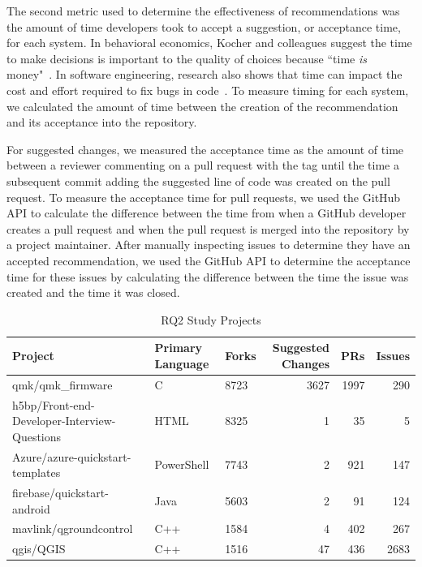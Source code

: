 The second metric used to determine the effectiveness of recommendations was the amount of time developers took to accept a suggestion, or acceptance time, for each system. In behavioral economics, Kocher and colleagues suggest the time to make decisions is important to the quality of choices because ``time \textit{is} money"~\cite{kocher2006time}. In software engineering, research also shows that time can impact the cost and effort required to fix bugs in code~\cite{Williams2007FaultFixTime}. To measure timing for each system, we calculated the amount of time between the creation of the recommendation and its acceptance into the repository.

For suggested changes, we measured the acceptance time as the amount of time between a reviewer commenting on a pull request with the \sugg tag until the time a subsequent commit adding the suggested line of code was created on the pull request. To measure the acceptance time for pull requests, we used the GitHub API to calculate the difference between the time from when a GitHub developer creates a pull request and when the pull request is merged into the repository by a project maintainer. After manually inspecting issues to determine they have an accepted recommendation, we used the GitHub API to determine the acceptance time for these issues by calculating the difference between the time the issue was created and the time it was closed.

\begin{table}[tbh]
\centering
\begin{tabular}{ lllrrr } \hline
  \textbf{Project} & \textbf{Primary Language} & \textbf{Forks} & \textbf{Suggested Changes} & \textbf{PRs} & \textbf{Issues} \\ \hline
 qmk/qmk\_firmware & C & 8723 & 3627 & 1997 & 290 \\
 h5bp/Front-end-Developer-Interview-Questions & HTML & 8325 & 1 & 35 & 5  \\
 Azure/azure-quickstart-templates & PowerShell & 7743 & 2 & 921 & 147 \\
 firebase/quickstart-android & Java & 5603 & 2 & 91 & 124 \\ 
 mavlink/qgroundcontrol & C++ & 1584 & 4 & 402 & 267 \\
 qgis/QGIS & C++ & 1516 & 47 & 436 & 2683 \\

\end{tabular}
\caption{RQ2 Study Projects}
\label{tab:projects}
\end{table}

